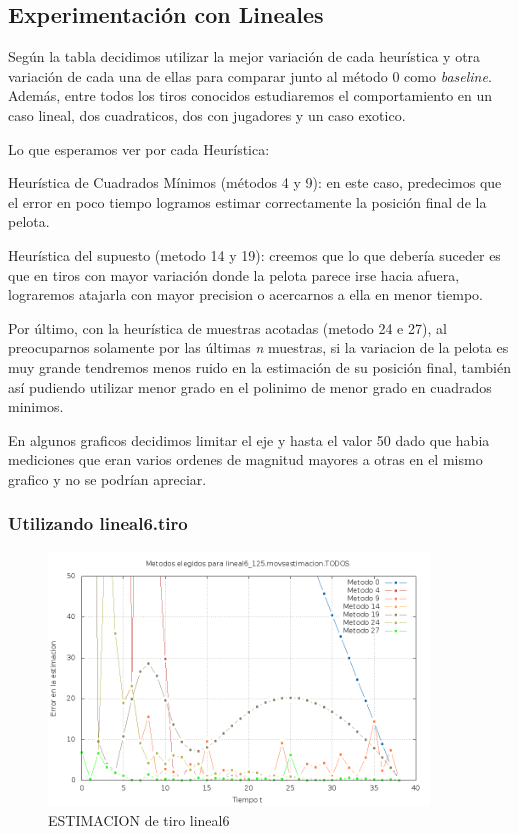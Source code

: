\subsection{Experimentación con Lineales}
Según la tabla decidimos utilizar la mejor variación de cada heurística y otra variación de cada una
de ellas para comparar junto al método 0 como \textit{baseline}. Además, entre todos los tiros
conocidos estudiaremos el comportamiento en un caso lineal, dos
cuadraticos, dos con jugadores y un caso exotico.

Lo que esperamos ver por cada Heurística:
\begin{compactitem}
\item Heurística de Cuadrados Mínimos (métodos 4 y 9): en este caso, predecimos que el error en poco tiempo logramos estimar
correctamente la posición final de la pelota.

\item Heurística del supuesto (metodo 14 y 19): creemos que lo que debería suceder es que en tiros con
mayor variación donde la pelota parece irse hacia afuera, lograremos atajarla con mayor precision o
acercarnos a ella en menor tiempo.

\item Por último, con la heurística de muestras acotadas (metodo 24 e 27), al preocuparnos solamente por
las últimas \textit{n} muestras, si la variacion de la pelota es muy grande tendremos menos ruido en la
estimación de su posición final, también así pudiendo utilizar menor grado en el polinimo de menor
grado en cuadrados minimos.
\end{compactitem}

En algunos graficos decidimos limitar el eje y hasta el valor 50 dado que habia mediciones que eran
varios ordenes de magnitud mayores a otras en el mismo grafico y no se podrían apreciar.

\subsubsection{Utilizando lineal6.tiro}

\begin{figure}[H]
\begin{center}
\includegraphics[width=0.9\textwidth]{img/lineal6_125_movsestimacion_TODOS_elegidos.png}
     \caption{ESTIMACION de tiro lineal6}
\end{center}
\end{figure}

